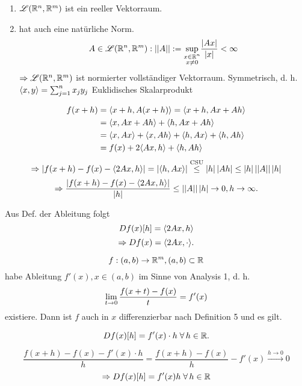 \documentclass[../ana2.tex]{subfiles}
\begin{document}
\begin{bsp}[5]
    \begin{enumerate}
        \item \( \mathscr{L}(\mathbb{R}^n, \mathbb{R}^m) \) ist ein reeller Vektorraum.
        \item hat auch eine natürliche Norm.
        \[ A \in \mathscr{L}(\mathbb{R}^n, \mathbb{R}^m) : \left|\left|A\right|\right| := 
        \underset{\substack{x \in \mathbb{R}^n \\ x \neq 0}}{\sup} 
        \frac{\left|Ax\right|}{\left|x\right|} < \infty \]
        \( \Rightarrow \mathscr{L}(\mathbb{R}^n, \mathbb{R}^m) \) ist 
        normierter vollständiger Vektorraum.
        Symmetrisch, d. h. \( \langle x, y \rangle 
        = \sum_{j=1}^n x_j y_j \) Euklidisches Skalarprodukt
    \end{enumerate}

    \begin{align*}
        f(x + h) &= \langle x + h, A(x+h) \rangle = \langle x + h, Ax + Ah \rangle\\
        &= \langle x, Ax + Ah \rangle + \langle h, Ax + Ah \rangle \\
        &= \langle x, Ax \rangle + \langle x, Ah \rangle + \langle h, Ax \rangle + \langle h, Ah \rangle\\
        &= f(x) + 2\langle Ax, h \rangle + \langle h, Ah \rangle
    \end{align*}
    \[ \Rightarrow \left| f(x+h) - f(x) - \langle 2Ax, h \rangle \right| 
    = \left| \langle h, Ax \rangle \right| 
    \overset{\text{CSU}}{\leq} \left|h\right| \left|Ah\right| 
    \leq \left|h\right| \left|\left|A\right|\right| \left|h\right| \]
    \[ \Rightarrow \frac{\left| f(x+h) - f(x) - \langle 2Ax, h \rangle \right| }{\left|h\right|} 
    \leq \left|\left|A\right|\right| \left|h\right| \rightarrow 0, h \rightarrow \infty. \]

    Aus Def. der Ableitung folgt 
    \[ Df(x)[h] = \langle 2Ax, h \rangle \]
    \[ \Rightarrow Df(x) = \langle 2Ax, \cdot \rangle. \]
\end{bsp}
\begin{bsp}[6]
    \[ f:(a,b)\rightarrow \mathbb{R}^m, (a, b) \subset \mathbb{R} \] 
    habe Ableitung \( f'(x), x \in (a,b) \) im Sinne von Analysis 1, 
    d. h. 
    \[ \lim\limits_{t\rightarrow{}0} \frac{f(x+t) - f(x)}{t} = f'(x) \] 
    existiere. Dann ist \(f\) auch in \(x\) differenzierbar nach 
    Definition 5 und es gilt.

    \[ Df(x)[h] = f'(x) \cdot h \;\forall h \in \R. \]
    \begin{bew}
        \[ \frac{f(x+h) - f(x) - f'(x) \cdot h}{h} = \frac{f(x+h)-f(x)}{h} - f'(x)
        \overset{h \rightarrow 0}{\longrightarrow} 0 \]
        \[ \Rightarrow D f(x)[h] = f'(x)h \; \forall h \in \R \]
    \end{bew}
\end{bsp}
\end{document}

